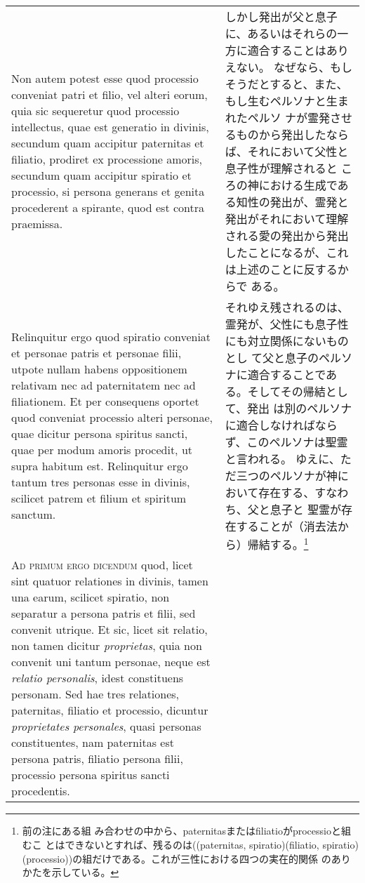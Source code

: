\documentclass[10pt]{jsarticle} %
\begin{document}
\begin{longtable}{p{21em}p{21em}}
\\




 Non autem potest esse quod
processio conveniat patri et filio, vel alteri eorum, quia sic
sequeretur quod processio intellectus, quae est generatio in divinis,
secundum quam accipitur paternitas et filiatio, prodiret ex
processione amoris, secundum quam accipitur spiratio et processio, si
persona generans et genita procederent a spirante, quod est contra
praemissa. 


&

しかし発出が父と息子に、あるいはそれらの一方に適合することはありえない。
 なぜなら、もしそうだとすると、また、もし生むペルソナと生まれたペルソ
 ナが霊発させるものから発出したならば、それにおいて父性と息子性が理解されると
 ころの神における生成である知性の発出が、霊発と発出がそれにおいて理解
 される愛の発出から発出したことになるが、これは上述のことに反するからで
 ある。


\\




Relinquitur ergo quod spiratio conveniat et personae patris
et personae filii, utpote nullam habens oppositionem relativam nec ad
paternitatem nec ad filiationem. Et per consequens oportet quod
conveniat processio alteri personae, quae dicitur persona spiritus
sancti, quae per modum amoris procedit, ut supra habitum
est. Relinquitur ergo tantum tres personas esse in divinis, scilicet
patrem et filium et spiritum sanctum.

&

それゆえ残されるのは、霊発が、父性にも息子性にも対立関係にないものとし
 て父と息子のペルソナに適合することである。そしてその帰結として、発出
 は別のペルソナに適合しなければならず、このペルソナは聖霊と言われる。
 ゆえに、ただ三つのペルソナが神において存在する、すなわち、父と息子と
 聖霊が存在することが（消去法から）帰結する。\footnote{前の注にある組
 み合わせの中から、paternitasまたはfiliatioがprocessioと組むこ
 とはできないとすれば、残るのは((paternitas, spiratio)(filiatio,
 spiratio)(processio))の組だけである。これが三性における四つの実在的関係
 のありかたを示している。}

\\



{\scshape Ad primum ergo dicendum} quod, licet sint quatuor relationes in
divinis, tamen una earum, scilicet spiratio, non separatur a persona
patris et filii, sed convenit utrique. Et sic, licet sit relatio, non
tamen dicitur {\itshape proprietas}, quia non convenit uni tantum personae, neque
est {\itshape relatio personalis}, idest constituens personam. Sed hae tres
relationes, paternitas, filiatio et processio, dicuntur {\itshape proprietates
personales}, quasi personas constituentes, nam paternitas est persona
patris, filiatio persona filii, processio persona spiritus sancti
procedentis.


\end{longtable}
\end{document}
